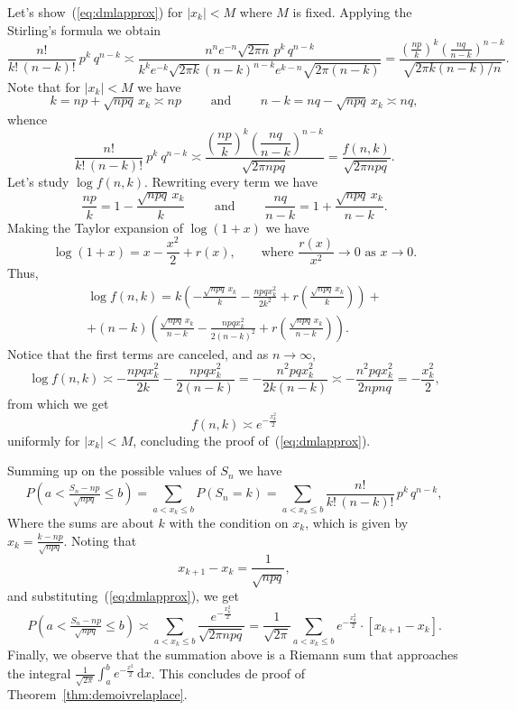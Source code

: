 \documentclass[12pt]{article}
\theoremstyle{definition}
\newcommand{\dd}{\mathrm{d}}
\renewcommand{\leq}{\leqslant}
\begin{document}
Let's show~(\ref{eq:dmlapprox}) for $ | x_k | <M $ where $ M $ is fixed. Applying the Stirling's formula we obtain
\[
\frac{n!}{k! \, (n-k)!} \ p^k \ q^{n-k}
\asymp
\frac
{n^n e^{-n} \sqrt{2\pi n}\, p^k \, q^{n-k}}
{k^k e^{-k} \sqrt{2\pi k} (n-k)^{n-k} e^{k-n} \sqrt{2\pi(n-k)}}
=
\frac
{( \frac{np}{k} )^k ( \frac{nq}{n-k} )^{n-k}}
{\sqrt{2\pi k(n-k)/n}}
.
\]
Note that for $ | x_k | <M $ we have
\[
k = np + \sqrt{npq} \, x_k \asymp np
\qquad
\mbox{ and }
\qquad
n-k = nq - \sqrt{npq} \, x_k \asymp nq
,
\]
whence
\[
\frac{n!}{k! \, (n-k)!} \ p^k \ q^{n-k}
\asymp
\frac
{\left( \dfrac{np}{k} \right)^k \left( \dfrac{nq}{n-k} \right)^{n-k}}
{\sqrt{2\pi npq}}
=
\frac{f(n,k)}{\sqrt{2\pi npq}}
.
\]
Let's study $ \log f (n, k) $. Rewriting every term we have
\[
\dfrac{np}{k} = 1 - \frac{\sqrt{npq}\, x_k}{k}
\qquad
\mbox{ and }
\qquad
\dfrac{nq}{n-k} = 1 + \frac{\sqrt{npq}\, x_k}{n-k}
.
\]
Making the Taylor expansion of $ \log (1 + x) $ we have
\[
\log(1+x) = x - \frac{x^2}{2} + r(x)
,
\qquad
\mbox{where } \frac{r(x)}{x^2} \to 0 \mbox{ as } x\to 0.
\]
Thus,
\begin{multline*}
\log f(n,k) =
k \left( - \frac{\sqrt{npq}\, x_k}{k} - \frac{npq x_k^2}{2k^2} + r( \tfrac{\sqrt{npq}\, x_k}{k}) \right)
+
\\
+ (n-k) \left( \frac{\sqrt{npq}\, x_k}{n-k} - \frac{{npq} x_k^2}{2(n-k)^2} + r(\tfrac{\sqrt{npq}\, x_k}{n-k}) \right).
\end{multline*}
Notice that the first terms are canceled, and as $n\to\infty$,
\[
\log f(n,k)
\asymp
- \frac{npq x_k^2}{2k} - \frac{{npq} x_k^2}{2(n-k)}
=
- \frac{n^2pqx_k^2}{2k(n-k)}
\asymp
- \frac{n^2pqx_k^2}{2npnq}
=
- \frac{x_k^2}{2}
,
\]
from which we get
\[
f(n,k) \asymp e^{-\frac{x_k^2}{2}}
\]
uniformly for $ | x_k | <M $, concluding the proof of~(\ref{eq:dmlapprox}).

Summing up on the possible values of $ S_n $ we have
\[
P \left( a < \tfrac{S_{n}-np}{\sqrt{npq}} \leq b \right)
=
\sum_{a<x_k\leq b} P(S_n = k)
=
\sum_{a<x_k\leq b} \frac{n!}{k! \, (n-k)!} \, p^k \, q^{n-k}
,
\]
Where the sums are about $ k $ with the condition on $ x_k $, which is given by $ x_k = \frac {k-np} {\sqrt {npq}} $. Noting that
\[
x_{k+1}-x_k = \frac{1}{\sqrt{npq}}
,
\]
and substituting~(\ref{eq:dmlapprox}), we get
\[
P \left( a < \tfrac{S_{n}-np}{\sqrt{npq}} \leq b \right)
\asymp
\sum_{a<x_k\leq b} \frac{e^{-\frac{x_k^2}{2}}}{\sqrt{2\pi npq}}
=
\frac{1}{\sqrt{2\pi}} \sum_{a<x_k\leq b} e^{-\frac{x_k^2}{2}} \cdot [x_{k+1}-x_k]
.
\]
Finally, we observe that the summation above is a Riemann sum that approaches the integral $\frac{1}{\sqrt{2\pi}} \int_a^b e^{-\frac{x^2}{2}}\, \dd x$. 
This concludes de proof of Theorem~\ref{thm:demoivrelaplace}.
\end{document}
